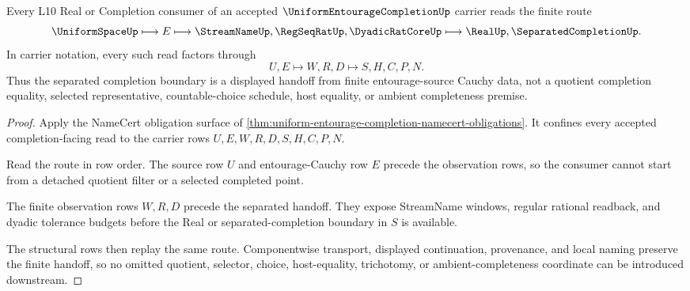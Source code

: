 \begin{theorem}
\label{thm:uniform-entourage-completion-l10-handoff}
Every L10 Real or Completion consumer of an accepted $\UniformEntourageCompletionUp$ carrier reads the finite route
$$
\UniformSpaceUp \longmapsto E \longmapsto \StreamNameUp,\RegSeqRatUp,\DyadicRatCoreUp \longmapsto \RealUp,\SeparatedCompletionUp .
$$
In carrier notation, every such read factors through
$$
U,E \longmapsto W,R,D \longmapsto S,H,C,P,N .
$$
Thus the separated completion boundary is a displayed handoff from finite entourage-source Cauchy data, not a quotient completion equality, selected representative, countable-choice schedule, host equality, or ambient completeness premise.
\end{theorem}
\begin{proof}
Apply the NameCert obligation surface of \autoref{thm:uniform-entourage-completion-namecert-obligations}. It confines every accepted completion-facing read to the carrier rows $U,E,W,R,D,S,H,C,P,N$.

Read the route in row order. The source row $U$ and entourage-Cauchy row $E$ precede the observation rows, so the consumer cannot start from a detached quotient filter or a selected completed point.

The finite observation rows $W,R,D$ precede the separated handoff. They expose StreamName windows, regular rational readback, and dyadic tolerance budgets before the Real or separated-completion boundary in $S$ is available.

The structural rows then replay the same route. Componentwise transport, displayed continuation, provenance, and local naming preserve the finite handoff, so no omitted quotient, selector, choice, host-equality, trichotomy, or ambient-completeness coordinate can be introduced downstream.
\end{proof}



